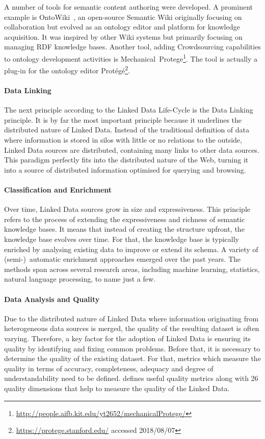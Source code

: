 A number of tools for semantic content authoring were developed. A prominent example is OntoWiki~\cite{auer2006}, an open-source Semantic Wiki originally focusing on collaboration but evolved as an ontology editor and platform for knowledge acquisition. It was inspired by other Wiki systems but primarily focusing on managing RDF knowledge bases.  Another tool, adding Crowdsourcing capabilities to ontology development activities is Mechanical~Protege\footnote{\url{http://people.aifb.kit.edu/yt2652/mechanicalProtege/}}. The tool is actually a plug-in for the ontology editor Protégé\footnote{\url{https://protege.stanford.edu/} accessed 2018/08/07}. 

\paragraph{Data Linking}
The next principle according to the Linked Data Life-Cycle is the Data Linking principle. It is by far the most important principle because it 
underlines the distributed nature of Linked Data. Instead of the traditional definition of data where information is stored in silos with little or no 
relations to the outside, Linked Data sources are distributed, containing many links to other data sources. This paradigm perfectly fits into the distributed nature of the Web, turning it into a source of distributed information optimised for querying and browsing. 

\paragraph{Classification and Enrichment}
Over time, Linked Data sources grow in size and expressiveness. This principle refers to the process of extending the expressiveness and richness 
of semantic knowledge bases. It means that instead of creating the structure upfront, the knowledge base evolves over time. For that, the knowledge 
base is typically enriched by analysing existing data to improve or extend its schema. A variety of (semi-)~automatic enrichment approaches emerged over the past years. The methods span across several research areas, including machine learning, statistics, natural language processing, to name just a few. 

\paragraph{Data Analysis and Quality}
Due to the distributed nature of Linked Data where information originating from heterogeneous data sources is merged, the quality of the resulting
dataset is often varying. Therefore, a key factor for the adoption of Linked Data is ensuring its quality by identifying and fixing common problems. Before that, it is necessary to determine the quality of the existing dataset. For that, metrics which measure the quality in terms of accuracy, completeness, adequacy and degree of understandability need to be defined. \cite{zaveri2016} defines useful quality metrics along with 26 quality dimensions that help to measure the quality of the Linked Data.

